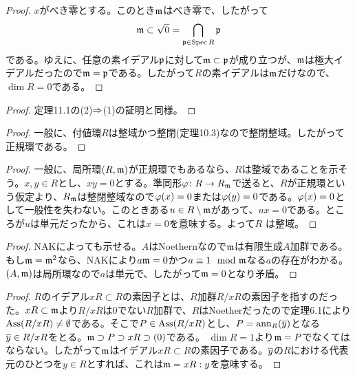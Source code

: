 \begin{proof}
  $x$がべき零とする。このとき$\mathfrak{m}$はべき零で、したがって
  \[
  \mathfrak{m} \subset \sqrt{0} = \bigcap_{\mathfrak{p} \in \operatorname{Spec} R} \mathfrak{p}
  \]
  である。ゆえに、任意の素イデアル$\mathfrak{p}$に対して$\mathfrak{m} \subset \mathfrak{p}$が成り立つが、$\mathfrak{m}$は極大イデアルだったので$\mathfrak{m} = \mathfrak{p}$である。したがって$R$の素イデアルは$\mathfrak{m}$だけなので、$\dim R = 0$である。
\end{proof}


\begin{proof}
  定理11.1の(2)$\Rightarrow$(1)の証明と同様。
\end{proof}


\begin{proof}
  一般に、付値環$R$は整域かつ整閉(定理10.3)なので整閉整域。したがって正規環である。
\end{proof}


\begin{proof}
  一般に、局所環$(R,\mathfrak{m})$が正規環でもあるなら、$R$は整域であることを示そう。$x,y \in R$とし、$xy=0$とする。準同形${\varphi} \colon R \to R_{\mathfrak{m}}$で送ると、$R$が正規環という仮定より、$R_{\mathfrak{m}}$は整閉整域なので${\varphi}(x)=0$または${\varphi}(y)=0$である。${\varphi}(x)=0$として一般性を失わない。このときある$u \in R \setminus \mathfrak{m}$があって、$ux=0$である。ところが$u$は単元だったから、これは$x=0$を意味する。よって$R$
  は整域。
\end{proof}



\begin{proof}
  NAKによっても示せる。$A$はNoethernなので$\mathfrak{m}$は有限生成$A$加群である。もし$\mathfrak{m} = \mathfrak{m}^2$なら、NAKにより$a \mathfrak{m} = 0$かつ$a \equiv 1 \mod {\mathfrak{m}}$なる$a$の存在がわかる。$(A,\mathfrak{m})$は局所環なので$a$は単元で、したがって$\mathfrak{m} = 0$となり矛盾。
\end{proof}


\begin{proof}
  $R$のイデアル$xR \subset R$の素因子とは、$R$加群$R/xR$の素因子を指すのだった。$xR \subset \mathfrak{m}$より$R/ xR$は$0$でない$R$加群で、$R$はNoetherだったので定理6.1により$\operatorname{Ass} (R/xR) \neq \emptyset$である。そこで$P \in \operatorname{Ass} (R/xR)$とし、$P = \operatorname{ann}_{R}(\overline{y})$となる$\overline{y} \in R/xR$をとる。$\mathfrak{m} \supset P \supset xR \supset (0)$である。
  $\dim R = 1$より$\mathfrak{m} = P$でなくてはならない。したがって$\mathfrak{m}$はイデアル$xR \subset R$の素因子である。$\overline{y}$の$R$における代表元のひとつを$y \in R$とすれば、これは$\mathfrak{m} = xR : y$を意味する。
\end{proof}



